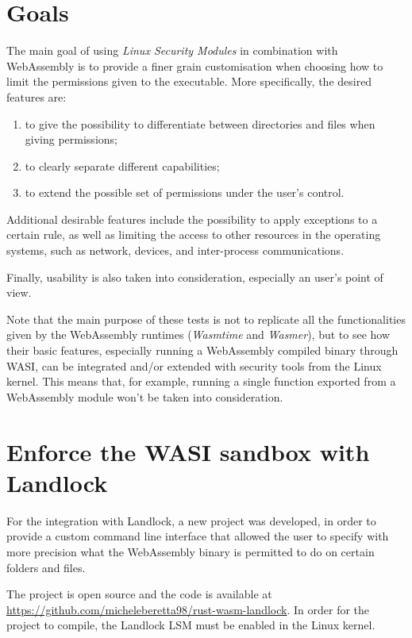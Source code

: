 \section{Goals}

The main goal of using \textit{Linux Security Modules} in combination with WebAssembly
is to provide a finer grain customisation when choosing how to limit the permissions given
to the executable. More specifically, the desired features are:
\begin{enumerate}
  \item to give the possibility to differentiate between directories and files when giving permissions;
  \item to clearly separate different capabilities;
  \item to extend the possible set of permissions under the user's control.
\end{enumerate}

Additional desirable features include the possibility to apply exceptions to a certain rule, as well
as limiting the access to other resources in the operating systems, such as network, devices, and
inter-process communications.

Finally, usability is also taken into consideration, especially an user's point of view.

Note that the main purpose of these tests is not to replicate all the functionalities given by
the WebAssembly runtimes (\textit{Wasmtime} and \textit{Wasmer}), but to see how their basic features,
especially running a WebAssembly compiled binary through WASI, can be integrated and/or extended with
security tools from the Linux kernel.
This means that, for example, running a single function exported from a WebAssembly module won't be taken
into consideration.

\newpage
\section{Enforce the WASI sandbox with Landlock}

For the integration with Landlock, a new project was developed, in order to provide
a custom command line interface that allowed the user to specify with more precision what
the WebAssembly binary is permitted to do on certain folders and files.

The project is open source and the code is available at \url{https://github.com/micheleberetta98/rust-wasm-landlock}.
In order for the project to compile, the Landlock LSM must be enabled in the Linux kernel.

